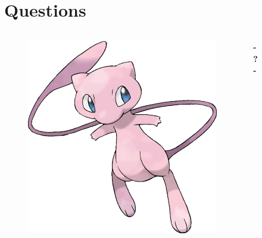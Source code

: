 \documentclass{beamer}
\begin{document}
\section{Questions}
\begin{frame}[plain]
	\titlepage
	\begin{columns}
		\begin{column}{0.3\linewidth}
			\begin{figure}
				\begin{center}
					\includegraphics[width=\textwidth]{slides/images/mew.png}
				\end{center}
			\end{figure}
		\end{column}
		\begin{column}{0.4\linewidth}
			\begin{center}
			\Huge\bfseries
				- ? -
			\end{center}
		\end{column}
		\begin{column}{0.3\linewidth}
			\begin{figure}
				\begin{center}

\end{center}
\end{figure}
\end{column}
\end{columns}
\end{frame}
\end{document}
